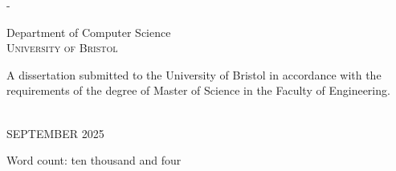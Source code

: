 \begin{titlingpage}
\begin{SingleSpace}
\begin{adjustwidth*}{\unitlength}{-\unitlength}
\begin{center}
\vspace{6mm}
{\large Department of Computer Science\\
\textsc{University of Bristol}}\\
\vspace{11mm}
\begin{minipage}{10cm}
A dissertation submitted to the University of Bristol in accordance with the requirements of the degree of Master of Science in the Faculty of Engineering.
\end{minipage}\\
\vspace{9mm}
{\large\textsc{SEPTEMBER 2025}}
\vspace{12mm}
\end{center}
\begin{flushright}
{\small Word count: ten thousand and four}
\end{flushright}
\end{adjustwidth*}
\end{SingleSpace}
\end{titlingpage}